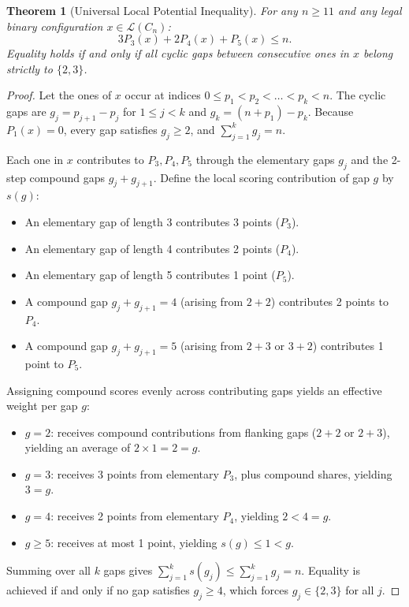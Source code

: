 \documentclass[11pt,a4paper]{article}
\newtheorem{theorem}{Theorem}[section]
\theoremstyle{definition}
\theoremstyle{remark}
\begin{document}
\begin{theorem}[Universal Local Potential Inequality]
\label{thm:potential}
For any $n \ge 11$ and any legal binary configuration $x \in \mathcal{L}(C_n)$:
\begin{equation}
    3P_3(x) + 2P_4(x) + P_5(x) \le n.
\end{equation}
Equality holds if and only if all cyclic gaps between consecutive ones in $x$ belong strictly to $\{2, 3\}$.
\end{theorem}

\begin{proof}
Let the ones of $x$ occur at indices $0 \le p_1 < p_2 < \dots < p_k < n$. The cyclic gaps are $g_j = p_{j+1} - p_j$ for $1 \le j < k$ and $g_k = (n + p_1) - p_k$. Because $P_1(x) = 0$, every gap satisfies $g_j \ge 2$, and $\sum_{j=1}^k g_j = n$.

Each one in $x$ contributes to $P_3, P_4, P_5$ through the elementary gaps $g_j$ and the 2-step compound gaps $g_j + g_{j+1}$. Define the local scoring contribution of gap $g$ by $s(g)$:
\begin{itemize}
    \item An elementary gap of length 3 contributes 3 points ($P_3$).
    \item An elementary gap of length 4 contributes 2 points ($P_4$).
    \item An elementary gap of length 5 contributes 1 point ($P_5$).
    \item A compound gap $g_j + g_{j+1} = 4$ (arising from $2+2$) contributes 2 points to $P_4$.
    \item A compound gap $g_j + g_{j+1} = 5$ (arising from $2+3$ or $3+2$) contributes 1 point to $P_5$.
\end{itemize}
Assigning compound scores evenly across contributing gaps yields an effective weight per gap $g$:
\begin{itemize}
    \item $g = 2$: receives compound contributions from flanking gaps ($2+2$ or $2+3$), yielding an average of $2 \times 1 = 2 = g$.
    \item $g = 3$: receives 3 points from elementary $P_3$, plus compound shares, yielding $3 = g$.
    \item $g = 4$: receives 2 points from elementary $P_4$, yielding $2 < 4 = g$.
    \item $g \ge 5$: receives at most 1 point, yielding $s(g) \le 1 < g$.
\end{itemize}
Summing over all $k$ gaps gives $\sum_{j=1}^k s(g_j) \le \sum_{j=1}^k g_j = n$. Equality is achieved if and only if no gap satisfies $g_j \ge 4$, which forces $g_j \in \{2, 3\}$ for all $j$.
\end{proof}
\end{document}

